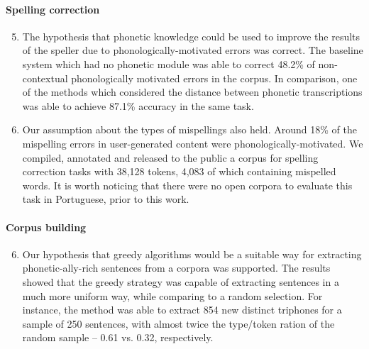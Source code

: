 \paragraph*{Spelling correction}
  \begin{enumerate}
    \setcounter{enumi}{4}
    \item The hypothesis that phonetic knowledge could be used to improve the results of the speller due to phonologically-motivated errors was correct. The baseline system which had no phonetic module was able to correct 48.2\% of non-contextual phonologically motivated errors in the corpus. In comparison, one of the methods which considered the distance between phonetic transcriptions was  able to achieve 87.1\% accuracy in the same task.
    \item Our assumption about the types of mispellings also held. Around 18\% of the mispelling errors in user-generated content were phonologically-motivated. We compiled, annotated and released to the public a corpus for spelling correction tasks with 38,128 tokens, 4,083 of which containing mispelled words. It is worth noticing that there were no open corpora to evaluate this task in Portuguese, prior to this work.
  \end{enumerate}

\paragraph*{Corpus building}
  \begin{enumerate}
    \setcounter{enumi}{5}
    \item Our hypothesis that greedy algorithms would be a suitable way for extracting phonetic-ally-rich sentences from a corpora was supported. The results showed that the greedy strategy was capable of extracting sentences in a much more uniform way, while comparing to a random selection. For instance, the method was able to extract 854 new distinct triphones for a sample of 250 sentences, with almost twice the type/token ration of the random sample -- 0.61 vs. 0.32, respectively.
  \end{enumerate}

